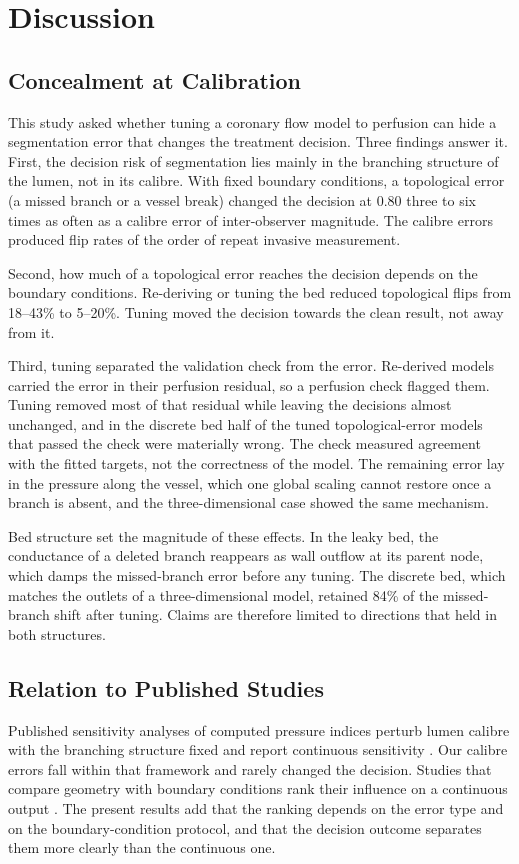\documentclass[journal]{IEEEtran}
\begin{document}
\section{Discussion}
\subsection{Concealment at Calibration}
This study asked whether tuning a coronary flow model to perfusion can hide a segmentation error that changes the
treatment decision. Three findings answer it. First, the decision risk of segmentation lies mainly in the branching structure of the lumen, not in its calibre.
With fixed boundary conditions, a topological error (a missed branch or a vessel break) changed the decision at
0.80 three to six times as often as a calibre error of inter-observer magnitude. The calibre errors produced flip
rates of the order of repeat invasive measurement.

Second, how much of a topological error reaches the decision depends on the boundary conditions. Re-deriving or
tuning the bed reduced topological flips from 18--43\% to 5--20\%. Tuning moved the decision towards the clean result, not away from it.

Third, tuning separated the validation check from the error. Re-derived models carried the error in their perfusion
residual, so a perfusion check flagged them. Tuning removed most of that residual while leaving the decisions almost
unchanged, and in the discrete bed half of the tuned topological-error models that passed the check were materially
wrong. The check measured agreement with the fitted targets, not the correctness of the model. The remaining error
lay in the pressure along the vessel, which one global scaling cannot restore once a branch is absent, and the
three-dimensional case showed the same mechanism.

Bed structure set the magnitude of these effects. In the leaky bed, the conductance of a deleted branch reappears
as wall outflow at its parent node, which damps the missed-branch error before any tuning. The discrete bed, which matches the outlets of a three-dimensional model, retained 84\% of the missed-branch shift
after tuning. Claims are therefore limited to directions that held in both structures.

\subsection{Relation to Published Studies}
Published sensitivity analyses of computed pressure indices perturb lumen calibre with the branching structure fixed and report
continuous sensitivity \cite{sankaran2015tmi,sankaran2015cmame,fernandez2024,dalmaso2025}. Our calibre errors fall within that framework and rarely changed the decision. Studies that compare geometry with boundary conditions rank their influence on a continuous output
\cite{sankaran2016,tanade2022,korte2023}. The present results add that the ranking depends on the error type and on
the boundary-condition protocol, and that the decision outcome separates them more clearly than the continuous
one.
\end{document}
